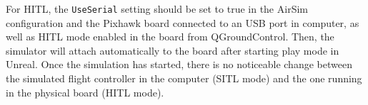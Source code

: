 For HITL, the \texttt{UseSerial} setting should be set to true in the AirSim configuration and the Pixhawk board connected to an USB port in computer, as well as HITL mode enabled in the board from QGroundControl.
Then, the simulator will attach automatically to the board after starting play mode in Unreal.
Once the simulation has started, there is no noticeable change between the simulated flight controller in the computer (SITL mode) and the one running in the physical board (HITL mode).
